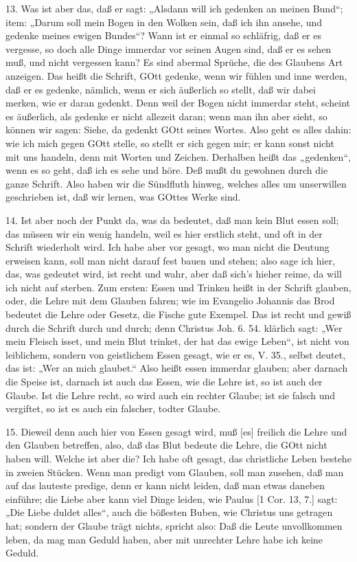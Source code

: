 13. Was ist aber das, daß er sagt: „Alsdann will ich gedenken an meinen Bund“; item: „Darum soll mein Bogen in den Wolken sein, daß ich ihn ansehe, und gedenke meines ewigen Bundes“? Wann ist er einmal so schläfrig, daß er es vergesse, so doch alle Dinge immerdar vor seinen Augen sind, daß er es sehen muß, und nicht vergessen kann? Es sind abermal Sprüche, die des Glaubens Art anzeigen. Das heißt die Schrift, GOtt gedenke, wenn wir fühlen und inne werden, daß er es gedenke, nämlich, wenn er sich äußerlich so stellt, daß wir dabei merken, wie er daran gedenkt. Denn weil der Bogen nicht immerdar steht, scheint es äußerlich, als gedenke er nicht allezeit daran; wenn man ihn aber sieht, so können wir sagen: Siehe, da gedenkt GOtt seines Wortes. Also geht es alles dahin: wie ich mich gegen GOtt stelle, so stellt er sich gegen mir; er kann sonst nicht mit uns handeln, denn mit Worten und Zeichen. Derhalben heißt das „gedenken“, wenn es so geht, daß ich es sehe und höre. Deß mußt du gewohnen durch die ganze Schrift. Also haben wir die Sündfluth hinweg, welches alles um unserwillen geschrieben ist, daß wir lernen, was GOttes Werke sind.

14. Ist aber noch der Punkt da, was da bedeutet, daß man kein Blut essen soll; das müssen wir ein wenig handeln, weil es hier erstlich steht, und oft in der Schrift wiederholt wird. Ich habe aber vor gesagt, wo man nicht die Deutung erweisen kann, soll man nicht darauf fest bauen und stehen; also sage ich hier, das, was gedeutet wird, ist recht und wahr, aber daß sich's hieher reime, da will ich nicht auf sterben. Zum ersten: Essen und Trinken heißt in der Schrift glauben, oder, die Lehre mit dem Glauben fahren; wie im Evangelio Johannis das Brod bedeutet die Lehre oder Gesetz, die Fische gute Exempel. Das ist recht und gewiß durch die Schrift durch und durch; denn Christus Joh. 6. 54. klärlich sagt: „Wer mein Fleisch isset, und mein Blut trinket, der hat das ewige Leben“, ist nicht von leiblichem, sondern von geistlichem Essen gesagt, wie er es, V. 35., selbst deutet, das ist: „Wer an mich glaubet.“ Also heißt essen immerdar glauben; aber darnach die Speise ist, darnach ist auch das Essen, wie die Lehre ist, so ist auch der Glaube. Ist die Lehre recht, so wird auch ein rechter Glaube; ist sie falsch und vergiftet, so ist es auch ein falscher, todter Glaube.

15. Dieweil denn auch hier von Essen gesagt wird, muß [es] freilich die Lehre und den Glauben betreffen, also, daß das Blut bedeute die Lehre, die GOtt nicht haben will. Welche ist aber die? Ich habe oft gesagt, das christliche Leben bestehe in zweien Stücken. Wenn man predigt vom Glauben, soll man zusehen, daß man auf das lauteste predige, denn er kann nicht leiden, daß man etwas daneben einführe; die Liebe aber kann viel Dinge leiden, wie Paulus [1 Cor. 13, 7.] sagt: „Die Liebe duldet alles“, auch die bößesten Buben, wie Christus uns getragen hat; sondern der Glaube trägt nichts, spricht also: Daß die Leute unvollkommen leben, da mag man Geduld haben, aber mit unrechter Lehre habe ich keine Geduld.


